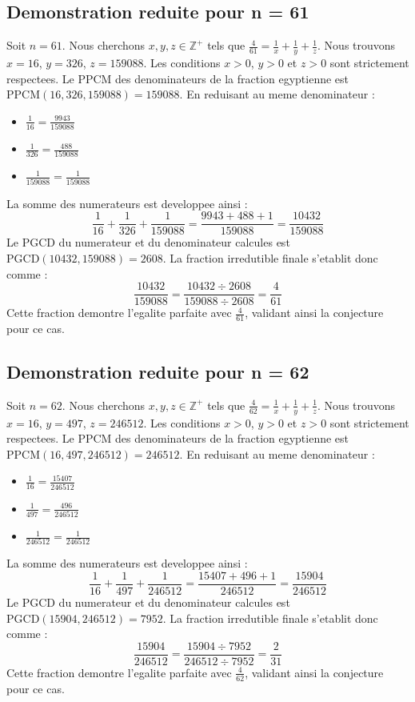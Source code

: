 \documentclass[11pt,a4paper]{article}
\begin{document}
\subsection{Demonstration reduite pour n = 61}
Soit $n = 61$. Nous cherchons $x, y, z \in \mathbb{Z}^{+}$ tels que $\frac{4}{61} = \frac{1}{x} + \frac{1}{y} + \frac{1}{z}$.
Nous trouvons $x = 16$, $y = 326$, $z = 159088$.
Les conditions $x > 0$, $y > 0$ et $z > 0$ sont strictement respectees.
Le PPCM des denominateurs de la fraction egyptienne est $\text{PPCM}(16, 326, 159088) = 159088$.
En reduisant au meme denominateur :
\begin{itemize}
    \item $\frac{1}{16} = \frac{9943}{159088}$
    \item $\frac{1}{326} = \frac{488}{159088}$
    \item $\frac{1}{159088} = \frac{1}{159088}$
\end{itemize}
La somme des numerateurs est developpee ainsi :
$$ \frac{1}{16} + \frac{1}{326} + \frac{1}{159088} = \frac{9943 + 488 + 1}{159088} = \frac{10432}{159088} $$
Le PGCD du numerateur et du denominateur calcules est $\text{PGCD}(10432, 159088) = 2608$.
La fraction irredutible finale s'etablit donc comme :
$$ \frac{10432}{159088} = \frac{10432 \div 2608}{159088 \div 2608} = \frac{4}{61} $$
Cette fraction demontre l'egalite parfaite avec $\frac{4}{61}$, validant ainsi la conjecture pour ce cas.

\subsection{Demonstration reduite pour n = 62}
Soit $n = 62$. Nous cherchons $x, y, z \in \mathbb{Z}^{+}$ tels que $\frac{4}{62} = \frac{1}{x} + \frac{1}{y} + \frac{1}{z}$.
Nous trouvons $x = 16$, $y = 497$, $z = 246512$.
Les conditions $x > 0$, $y > 0$ et $z > 0$ sont strictement respectees.
Le PPCM des denominateurs de la fraction egyptienne est $\text{PPCM}(16, 497, 246512) = 246512$.
En reduisant au meme denominateur :
\begin{itemize}
    \item $\frac{1}{16} = \frac{15407}{246512}$
    \item $\frac{1}{497} = \frac{496}{246512}$
    \item $\frac{1}{246512} = \frac{1}{246512}$
\end{itemize}
La somme des numerateurs est developpee ainsi :
$$ \frac{1}{16} + \frac{1}{497} + \frac{1}{246512} = \frac{15407 + 496 + 1}{246512} = \frac{15904}{246512} $$
Le PGCD du numerateur et du denominateur calcules est $\text{PGCD}(15904, 246512) = 7952$.
La fraction irredutible finale s'etablit donc comme :
$$ \frac{15904}{246512} = \frac{15904 \div 7952}{246512 \div 7952} = \frac{2}{31} $$
Cette fraction demontre l'egalite parfaite avec $\frac{4}{62}$, validant ainsi la conjecture pour ce cas.
\end{document}
